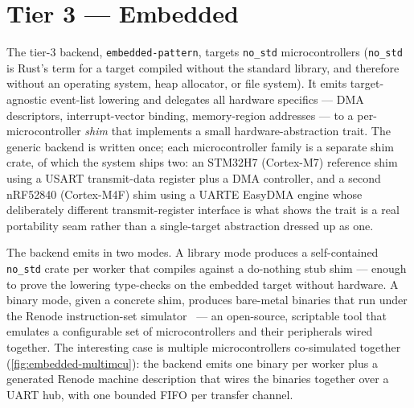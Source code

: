 \section{Tier 3 --- Embedded}\label{sec:be-tier3}

The tier-3 backend, \texttt{embedded-pattern}, targets \texttt{no\_std}
microcontrollers (\texttt{no\_std} is Rust's term for a target compiled without the
standard library, and therefore without an operating system, heap allocator, or
file system). It emits target-agnostic event-list lowering and delegates all
hardware specifics --- DMA descriptors, interrupt-vector binding, memory-region
addresses --- to a per-microcontroller \emph{shim} that implements a small
hardware-abstraction trait. The generic backend is written once; each
microcontroller family is a separate shim crate, of which the system ships two: an
STM32H7 (Cortex-M7) reference shim using a USART transmit-data register plus a DMA
controller, and a second nRF52840 (Cortex-M4F) shim using a UARTE EasyDMA engine
whose deliberately different transmit-register interface is what shows the trait is
a real portability seam rather than a single-target abstraction dressed up as one.

The backend emits in two modes. A library mode produces a self-contained
\texttt{no\_std} crate per worker that compiles against a do-nothing stub shim ---
enough to prove the lowering type-checks on the embedded target without hardware.
A binary mode, given a concrete shim, produces bare-metal binaries that run under
the Renode instruction-set simulator~\cite{renode} --- an open-source, scriptable tool
that emulates a configurable set of microcontrollers and their peripherals wired together. The interesting case is multiple
microcontrollers co-simulated together (\cref{fig:embedded-multimcu}): the
backend emits one binary per worker plus a generated Renode machine description
that wires the binaries together over a UART hub, with one bounded FIFO per
transfer channel.

